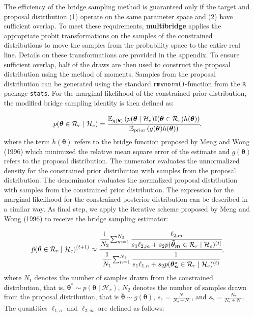 \documentclass[
  english,
  man,floatsintext]{apa6}
\begin{document}
The efficiency of the bridge sampling method is guaranteed only if the target and proposal distribution (1) operate on the same parameter space and (2) have sufficient overlap. To meet these requirements, \textbf{multibridge} applies the appropriate probit transformations on the samples of the constrained distributions to move the samples from the probability space to the entire real line. Details on these transformations are provided in the appendix. To ensure sufficient overlap, half of the draws are then used to construct the proposal distribution using the method of moments. Samples from the proposal distribution can be generated using the standard \texttt{rmvnorm()}-function from the \texttt{R} package \texttt{stats}. For the marginal likelihood of the constrained prior distribution, the modified bridge sampling identity is then defined as:

\begin{align}
    p(\boldsymbol{\theta} \in \mathcal{R}_r \mid \mathcal{H}_e) = \cfrac{\mathbb{E}_{g(\boldsymbol{\theta})}\left(p(\boldsymbol{\theta}\mid \mathcal{H}_e) \mathbb{I}(\boldsymbol{\theta}\in\mathcal{R}_r)h(\boldsymbol{\theta})\right)}{\mathbb{E}_{\text{prior}} \left(g(\boldsymbol{\theta})h(\boldsymbol{\theta})\right)},
    \label{Eq:bridgeidentity}
\end{align}
where the term \(h(\boldsymbol{\theta})\) refers to the bridge function proposed by Meng and Wong (1996) which minimized the relative mean square error of the estimate and \(g(\boldsymbol{\theta})\) refers to the proposal distribution. The numerator evaluates the unnormalized density for the constrained prior distribution with samples from the proposal distribution. The denominator evaluates the normalized proposal distribution with samples from the constrained prior distribution. The expression for the marginal likelihood for the constrained posterior distribution can be described in a similar way. As final step, we apply the iterative scheme proposed by Meng and Wong (1996) to receive the bridge sampling estimator:

\begin{align*}
    \hat p(\boldsymbol{\theta} \in \mathcal{R}_r \mid \mathcal{H}_e)^{(t+1)} \approx \cfrac{\cfrac{1}{N_2} \sum_{m = 1}^{N_2} \cfrac{\ell_{2,m}}{s_1 \ell_{2,m} + s_2 p(\boldsymbol{\tilde \theta_m} \in \mathcal{R}_r \mid \mathcal{H}_e)^{(t)}}}
    {\cfrac{1}{N_1} \sum_{n = 1}^{N_1} \cfrac{1}{s_1 \ell_{1,n} + s_2 p(\boldsymbol{\theta^*_n} \in \mathcal{R}_r \mid \mathcal{H}_e)^{(t)}}},
\end{align*}
where \(N_1\) denotes the number of samples drawn from the constrained distribution, that is, \(\boldsymbol{\theta}^* \sim p(\boldsymbol{\theta} \mid \mathcal{H}_r)\), \(N_2\) denotes the number of samples drawn from the proposal distribution, that is \(\boldsymbol{\tilde \theta} \sim g(\boldsymbol{\theta})\),
\(s_1 = \frac{N_1}{N_2 + N_1}\), and \(s_2 = \frac{N_2}{N_2 + N_1}\). The quantities \(\ell_{1,n}\) and \(\ell_{2,m}\) are defined as follows:
\end{document}
